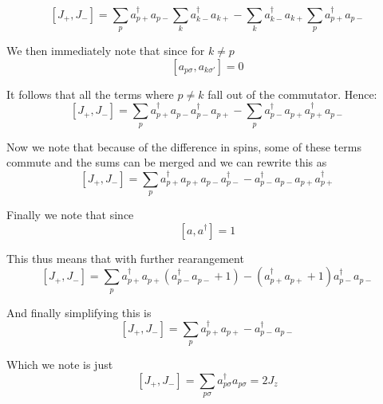 \documentclass[11pt]{article} %
\begin{document}
\begin{equation}
\left[J_+,J_-\right]=\sum_p a_{p+}^\dagger a_{p-} \sum_k a_{k-}^\dagger a_{k+}-\sum_k a_{k-}^\dagger a_{k+} \sum_p a_{p+}^\dagger a_{p-}   \end{equation}

We then immediately note that since for $k\neq p$ \\
\begin{equation}
\left[a_{p\sigma},a_{k\sigma'}\right]=0 
\end{equation}

It follows that all the terms where $p \neq k$ fall out of the commutator. Hence:
\begin{equation}
\left[J_+,J_-\right]=\sum_p a_{p+}^\dagger a_{p-} a_{p-}^\dagger a_{p+}-\sum_p a_{p-}^\dagger a_{p+}  a_{p+}^\dagger a_{p-}   \end{equation}

Now we note that because of the difference in spins, some of these terms commute and the sums can be merged and we can rewrite this as\\
\begin{equation}
\left[J_+,J_-\right]=\sum_p a_{p+}^\dagger a_{p+}a_{p-} a_{p-}^\dagger - a_{p-}^\dagger a_{p-}  a_{p+} a_{p+}^\dagger    \end{equation}

Finally we note that since \\
\begin{equation}
\left[a,a^\dagger\right]=1
\end{equation}

This thus means that with further rearangement\\

\begin{equation}
\left[J_+,J_-\right]=\sum_p a_{p+}^\dagger a_{p+} (a_{p-}^\dagger a_{p-}+1) - (a_{p+}^\dagger a_{p+} +1) a_{p-}^\dagger a_{p-}      \end{equation}


And finally simplifying this is\\

\begin{equation}
\left[J_+,J_-\right]=\sum_p a_{p+}^\dagger a_{p+}  - a_{p-}^\dagger a_{p-}      \end{equation}

Which we note is just\\

\begin{equation}
\left[J_+,J_-\right]=\sum_{p\sigma} a_{p\sigma}^\dagger a_{p\sigma} =2J_z     \end{equation}
\end{document}
